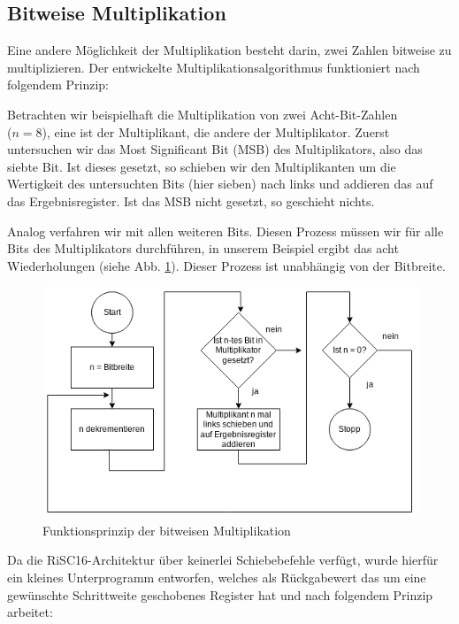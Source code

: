 \documentclass[fleqn, a4paper, 11pt]{article}       %
\begin{document}
\subsection{Bitweise Multiplikation}
Eine andere Möglichkeit der Multiplikation besteht darin, zwei Zahlen bitweise zu multiplizieren. Der entwickelte Multiplikationsalgorithmus funktioniert nach folgendem Prinzip:

Betrachten wir beispielhaft die Multiplikation von zwei Acht-Bit-Zahlen \\ ($n = 8$), eine ist der Multiplikant, die andere der Multiplikator. Zuerst untersuchen wir das Most Significant Bit (MSB) des Multiplikators, also das siebte Bit. Ist dieses gesetzt, so schieben wir den Multiplikanten um die Wertigkeit des untersuchten Bits (hier sieben) nach links und addieren das auf das Ergebnisregister. Ist das MSB nicht gesetzt, so geschieht nichts. \cite{MULv3}

Analog verfahren wir mit allen weiteren Bits. Diesen Prozess müssen wir für alle Bits des Multiplikators durchführen, in unserem Beispiel ergibt das acht Wiederholungen (siehe Abb. \ref{fig:bitw_Mul_Prinzip}). Dieser Prozess ist unabhängig von der Bitbreite.



\begin{figure}[h]
    \includegraphics[width =1\textwidth]{bitweise_Mul_Prinzip.png}
\caption{Funktionsprinzip der bitweisen Multiplikation}
\label{fig:bitw_Mul_Prinzip}
\end{figure}



Da die RiSC16-Architektur über keinerlei Schiebebefehle verfügt, wurde hierfür ein kleines Unterprogramm entworfen, welches als Rückgabewert das um eine gewünschte Schrittweite geschobenes Register hat und nach folgendem Prinzip arbeitet:
\end{document}
